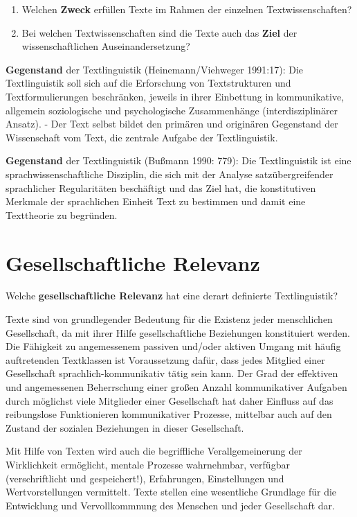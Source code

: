 \documentclass[
  letterpaper,
]{scrbook}
\providecommand{\tightlist}{%
  \setlength{\itemsep}{0pt}\setlength{\parskip}{0pt}}\usepackage{longtable,booktabs,array}
\begin{document}
\begin{enumerate}
\def\labelenumi{\arabic{enumi}.}
\tightlist
\item
  Welchen \textbf{Zweck} erfüllen Texte im Rahmen der einzelnen
  Textwissenschaften?\\
\item
  Bei welchen Textwissenschaften sind die Texte auch das \textbf{Ziel}
  der wissenschaftlichen Auseinandersetzung?
\end{enumerate}

\textbf{Gegenstand} der Textlinguistik (Heinemann/Viehweger 1991:17):
Die Textlinguistik soll sich auf die Erforschung von Textstrukturen und
Textformulierungen beschränken, jeweils in ihrer Einbettung in
kommunikative, allgemein soziologische und psychologische Zusammenhänge
(interdisziplinärer Ansatz). - Der Text selbst bildet den primären und
originären Gegenstand der Wissenschaft vom Text, die zentrale Aufgabe
der Textlinguistik.

\textbf{Gegenstand} der Textlinguistik (Bußmann 1990: 779): Die
Textlinguistik ist eine sprachwissenschaftliche Disziplin, die sich mit
der Analyse satzübergreifender sprachlicher Regularitäten beschäftigt
und das Ziel hat, die konstitutiven Merkmale der sprachlichen Einheit
Text zu bestimmen und damit eine Texttheorie zu begründen.

\hypertarget{gesellschaftliche-relevanz}{%
\section{Gesellschaftliche Relevanz}\label{gesellschaftliche-relevanz}}

Welche \textbf{gesellschaftliche Relevanz} hat eine derart definierte
Textlinguistik?

Texte sind von grundlegender Bedeutung für die Existenz jeder
menschlichen Gesellschaft, da mit ihrer Hilfe gesellschaftliche
Beziehungen konstituiert werden. Die Fähigkeit zu angemessenem passiven
und/oder aktiven Umgang mit häufig auftretenden Textklassen ist
Voraussetzung dafür, dass jedes Mitglied einer Gesellschaft
sprachlich-kommunikativ tätig sein kann. Der Grad der effektiven und
angemessenen Beherrschung einer großen Anzahl kommunikativer Aufgaben
durch möglichst viele Mitglieder einer Gesellschaft hat daher Einfluss
auf das reibungslose Funktionieren kommunikativer Prozesse, mittelbar
auch auf den Zustand der sozialen Beziehungen in dieser Gesellschaft.

Mit Hilfe von Texten wird auch die begriffliche Verallgemeinerung der
Wirklichkeit ermöglicht, mentale Prozesse wahrnehmbar, verfügbar
(verschriftlicht und gespeichert!), Erfahrungen, Einstellungen und
Wertvorstellungen vermittelt. Texte stellen eine wesentliche Grundlage
für die Entwicklung und Vervollkommnung des Menschen und jeder
Gesellschaft dar.
\end{document}
